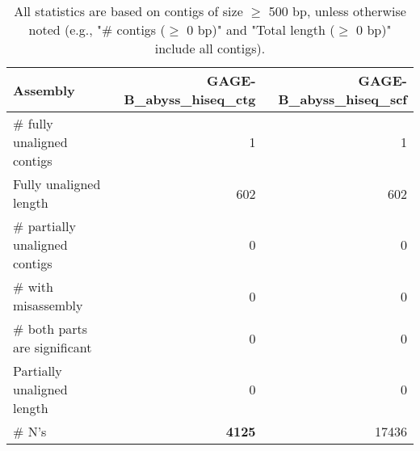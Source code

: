 \documentclass[12pt,a4paper]{article}
\begin{document}
\begin{table}[ht]
\begin{center}
\caption{All statistics are based on contigs of size $\geq$ 500 bp, unless otherwise noted (e.g., "\# contigs ($\geq$ 0 bp)" and "Total length ($\geq$ 0 bp)" include all contigs).}
\begin{tabular}{|l*{2}{|r}|}
\hline
Assembly & GAGE-B\_abyss\_hiseq\_ctg & GAGE-B\_abyss\_hiseq\_scf \\ \hline
\# fully unaligned contigs & 1 & 1 \\ \hline
Fully unaligned length & 602 & 602 \\ \hline
\# partially unaligned contigs & 0 & 0 \\ \hline
\hspace{5mm}\# with misassembly & 0 & 0 \\ \hline
\hspace{5mm}\# both parts are significant & 0 & 0 \\ \hline
Partially unaligned length & 0 & 0 \\ \hline
\# N's & {\bf 4125} & 17436 \\ \hline
\end{tabular}
\end{center}
\end{table}
\end{document}
